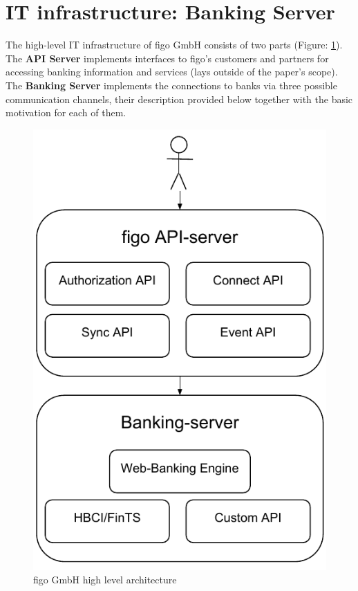 \section{IT infrastructure: Banking Server}
\label{sec:infrastructure}
The high-level IT infrastructure of figo GmbH consists of two parts (Figure: \ref{fig:figoArch}). The \textbf{API Server} implements interfaces to figo's customers and partners for accessing banking information and services (lays outside of the paper's scope). The \textbf{Banking Server} implements the connections to banks via three possible communication channels, their description provided below together with the basic motivation for each of them.
\begin{figure}[ht]
  	\label{fig:figoArch}
    \centering
    \includegraphics[scale=0.7]{grafiken/figoArch}
     \caption{figo GmbH high level architecture}
\end{figure}

